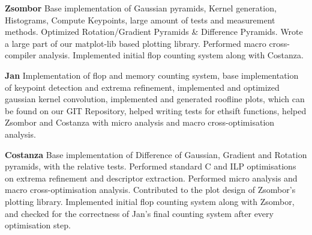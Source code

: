 \documentclass[letterpaper]{article}
\begin{document}
\textbf{Zsombor} Base implementation of Gaussian pyramids, Kernel generation, Histograms, Compute Keypoints, large amount of tests and measurement methods. Optimized Rotation/Gradient Pyramids \& Difference Pyramids. Wrote a large part of our matplot-lib based plotting library. Performed macro cross-compiler analysis. Implemented initial flop counting system along with Costanza.

\textbf{Jan} Implementation of flop and memory counting system, base implementation of keypoint detection and extrema refinement, implemented and optimized gaussian kernel convolution, implemented and generated roofline plots, which can be found on our GIT Repository, helped writing tests for ethsift functions, helped Zsombor and Costanza with micro analysis and macro cross-optimisation analysis.
 
\textbf{Costanza} Base implementation of Difference of Gaussian, Gradient and Rotation pyramids, with the relative tests. Performed standard C and ILP optimisations on extrema refinement and descriptor extraction. Performed micro analysis and macro cross-optimisation analysis. Contributed to the plot design of Zsombor's plotting library. Implemented initial flop counting system along with Zsombor, and checked for the correctness of Jan's final counting system after every optimisation step. 


\end{document}
